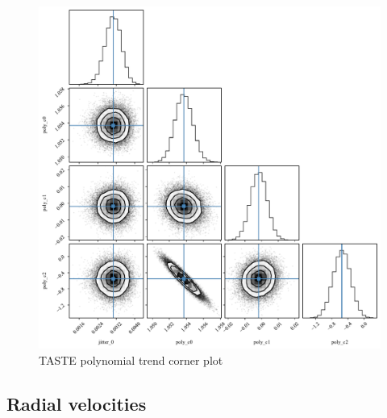 \documentclass[a4paper,11pt,twocolumn]{article}
\begin{document}
\begin{figure}[H]
  \centering
    \includegraphics[scale=0.4, angle=0]{../pictures/taste/poly.pdf}
    \caption{TASTE polynomial trend corner plot}
\end{figure}


\newpage

\subsection{Radial velocities}
\label{sect:app_C_RV}
\end{document}
